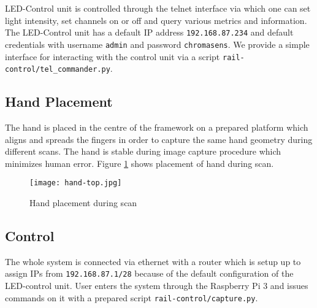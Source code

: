 LED-Control unit is controlled through the telnet interface via which one can set light intensity, set channels on or off and query various metrics and information. The LED-Control unit has a default IP address \texttt{192.168.87.234} and default credentials with username \texttt{admin} and password \texttt{chromasens}. We provide a simple interface for interacting with the control unit via a script \texttt{rail-control/tel\_commander.py}.

\subsection{Hand Placement}
The hand is placed in the centre of the framework on a prepared platform which aligns and spreads the fingers in order to
capture the same hand geometry during different scans. The hand is stable during image capture procedure which minimizes human error.
Figure \ref{fig:hand-placement} shows placement of hand during scan.

\begin{figure}[ht]
    \label{fig:hand-placement}
    \centering
    \texttt{[image: hand-top.jpg]}
    \caption{Hand placement during scan}
\end{figure}

\subsection{Control}
The whole system is connected via ethernet with a router which is setup up to assign IPs from \texttt{192.168.87.1/28} because of the default configuration of the LED-control unit. User enters the system through the Raspberry Pi 3 and issues commands on it with a prepared script \texttt{rail-control/capture.py}.

